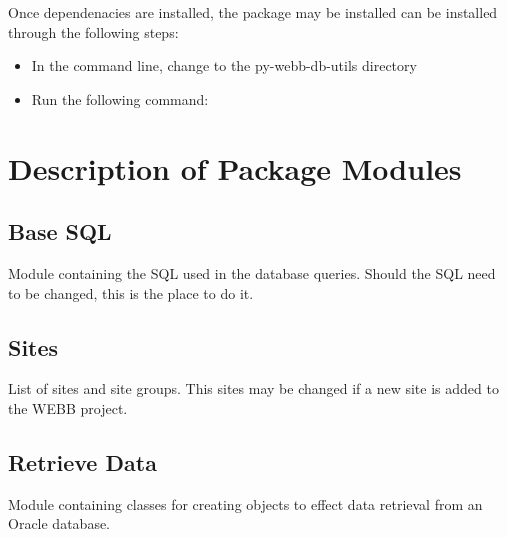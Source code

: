 \documentclass[letterpaper,10pt,english]{sphinxmanual}
\begin{document}
Once dependenacies are installed, the package may be installed can be installed through the following steps:
\begin{itemize}
\item {} 
In the command line, change to the py-webb-db-utils directory

\item {} 
Run the following command: 

\end{itemize}


\chapter{Description of Package Modules}
\label{modules::doc}\label{modules:description-of-package-modules}

\section{Base SQL}
\label{modules:base-sql}
Module containing the SQL used in the database queries.
Should the SQL need to be changed, this is the place to
do it.


\section{Sites}
\label{modules:sites}
List of sites and site groups. This sites may be changed
if a new site is added to the WEBB project.


\section{Retrieve Data}
\label{modules:retrieve-data}
Module containing classes for creating objects to
effect data retrieval from an Oracle database.
\end{document}
